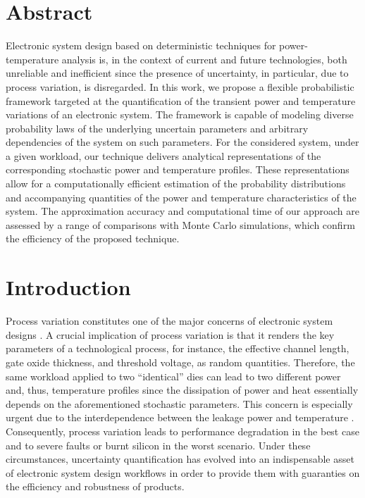 \section{Abstract}

Electronic system design based on deterministic techniques for power-temperature
analysis is, in the context of current and future technologies, both unreliable
and inefficient since the presence of uncertainty, in particular, due to process
variation, is disregarded. In this work, we propose a flexible probabilistic
framework targeted at the quantification of the transient power and temperature
variations of an electronic system. The framework is capable of modeling diverse
probability laws of the underlying uncertain parameters and arbitrary
dependencies of the system on such parameters. For the considered system, under
a given workload, our technique delivers analytical representations of the
corresponding stochastic power and temperature profiles. These representations
allow for a computationally efficient estimation of the probability
distributions and accompanying quantities of the power and temperature
characteristics of the system. The approximation accuracy and computational time
of our approach are assessed by a range of comparisons with Monte Carlo
simulations, which confirm the efficiency of the proposed technique.

\section{Introduction}

Process variation constitutes one of the major concerns of electronic system
designs \cite{chandrakasan2000, srivastava2010}. A crucial implication of
process variation is that it renders the key parameters of a technological
process, for instance, the effective channel length, gate oxide thickness, and
threshold voltage, as random quantities. Therefore, the same workload applied to
two ``identical'' dies can lead to two different power and, thus, temperature
profiles since the dissipation of power and heat essentially depends on the
aforementioned stochastic parameters. This concern is especially urgent due to
the interdependence between the leakage power and temperature
\cite{srivastava2010, liu2007}. Consequently, process variation leads to
performance degradation in the best case and to severe faults or burnt silicon
in the worst scenario. Under these circumstances, uncertainty quantification
\cite{xiu2010} has evolved into an indispensable asset of electronic system
design workflows in order to provide them with guaranties on the efficiency and
robustness of products.

